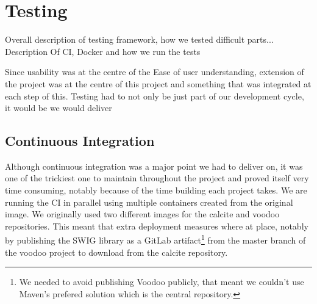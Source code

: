 













\section{Testing}

Overall description of testing framework, how we tested difficult parts... Description Of CI, Docker and how we run the tests

Since usability was at the centre of the 
Ease of user understanding, extension of the project was at the centre of this project and something that was integrated at each step of this. Testing had to not only be just part of our development cycle, it would be we would deliver 


\subsection{Continuous Integration}

Although continuous integration was a major point we had to deliver on, it was one of the trickiest one to maintain throughout the project and proved itself very time consuming, notably because of the time building each project takes. We are running the CI in parallel using multiple containers created from the original image. We originally used two different images for the calcite and voodoo repositories. This meant that extra deployment measures where at place, notably by publishing the SWIG library as a GitLab artifact\footnote{We needed to avoid publishing Voodoo publicly, that meant we couldn't use Maven's prefered solution which is the central repository.} from the master branch of the voodoo project to download from the calcite repository. 

